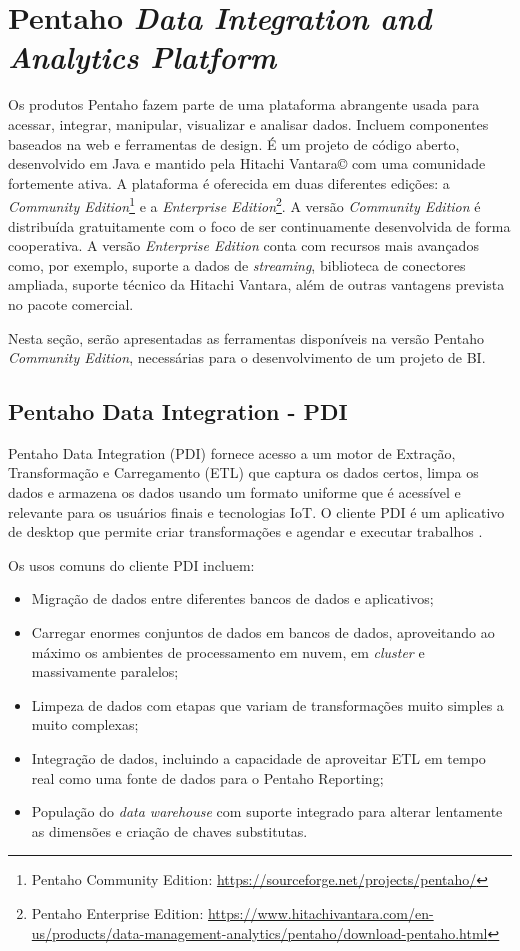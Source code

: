 \section{Pentaho \textit{Data Integration and Analytics Platform}}
Os produtos Pentaho fazem parte de uma plataforma abrangente usada para acessar, integrar, manipular, visualizar e analisar dados. Incluem componentes baseados na web e ferramentas de design. É um projeto de código aberto, desenvolvido em Java e mantido pela Hitachi Vantara© com uma comunidade fortemente ativa. A plataforma é oferecida em duas diferentes edições: a \textit{Community Edition}\footnote{Pentaho Community Edition: \url{https://sourceforge.net/projects/pentaho/}} e a \textit{Enterprise Edition}\footnote{Pentaho Enterprise Edition: \url{https://www.hitachivantara.com/en-us/products/data-management-analytics/pentaho/download-pentaho.html}}. A versão \textit{Community Edition} é distribuída gratuitamente com o foco de ser continuamente desenvolvida de forma cooperativa. A versão \textit{Enterprise Edition} conta com recursos mais avançados como, por exemplo, suporte a dados de \textit{streaming}, biblioteca de conectores ampliada, suporte técnico da Hitachi Vantara, além de outras vantagens prevista no pacote comercial. 

Nesta seção, serão apresentadas as ferramentas disponíveis na versão Pentaho \textit{Community Edition}, necessárias para o desenvolvimento de um projeto de BI.

\subsection{Pentaho Data Integration - PDI}
Pentaho Data Integration (PDI) fornece acesso a um motor de Extração, Transformação e Carregamento (ETL) que captura os dados certos, limpa os dados e armazena os dados usando um formato uniforme que é acessível e relevante para os usuários finais e tecnologias IoT. O cliente PDI é um aplicativo de desktop que permite criar transformações e agendar e executar trabalhos \cite{pentahodocumentation}.

Os usos comuns do cliente PDI incluem:
\begin{itemize}
    \item Migração de dados entre diferentes bancos de dados e aplicativos;
    \item Carregar enormes conjuntos de dados em bancos de dados, aproveitando ao máximo os ambientes de processamento em nuvem, em \textit{cluster} e massivamente paralelos;
    \item Limpeza de dados com etapas que variam de transformações muito simples a muito complexas;
    \item Integração de dados, incluindo a capacidade de aproveitar ETL em tempo real como uma fonte de dados para o Pentaho Reporting;
    \item População do \textit{data warehouse} com suporte integrado para alterar lentamente as dimensões e criação de chaves substitutas.
\end{itemize}

